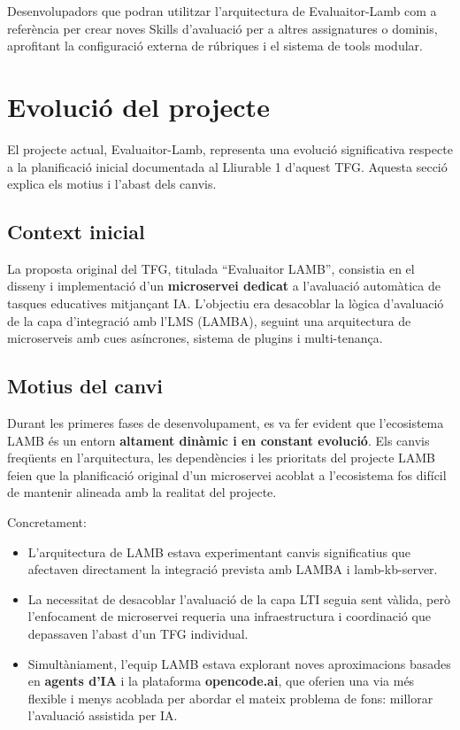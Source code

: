 \documentclass[12pt,a4paper,twoside]{report}
\begin{document}
Desenvolupadors que podran utilitzar l'arquitectura de Evaluaitor-Lamb com a refer\`encia per crear noves Skills d'avaluaci\'o per a altres assignatures o dominis, aprofitant la configuraci\'o externa de r\'ubriques i el sistema de tools modular.

\section{Evoluci\'o del projecte}
\label{sec:evolucio}

El projecte actual, Evaluaitor-Lamb, representa una evoluci\'o significativa respecte a la planificaci\'o inicial documentada al Lliurable 1 d'aquest TFG. Aquesta secci\'o explica els motius i l'abast dels canvis.

\subsection{Context inicial}

La proposta original del TFG, titulada ``Evaluaitor LAMB'', consistia en el disseny i implementaci\'o d'un \textbf{microservei dedicat} a l'avaluaci\'o autom\`atica de tasques educatives mitjan\c{c}ant IA. L'objectiu era desacoblar la l\`ogica d'avaluaci\'o de la capa d'integraci\'o amb l'LMS (LAMBA), seguint una arquitectura de microserveis amb cues as\'incrones, sistema de plugins i multi-tenan\c{c}a.

\subsection{Motius del canvi}

Durant les primeres fases de desenvolupament, es va fer evident que l'ecosistema LAMB \'es un entorn \textbf{altament din\`amic i en constant evoluci\'o}. Els canvis freq\"uents en l'arquitectura, les depend\`encies i les prioritats del projecte LAMB feien que la planificaci\'o original d'un microservei acoblat a l'ecosistema fos dif\'icil de mantenir alineada amb la realitat del projecte.

Concretament:

\begin{itemize}
    \item L'arquitectura de LAMB estava experimentant canvis significatius que afectaven directament la integraci\'o prevista amb LAMBA i lamb-kb-server.
    \item La necessitat de desacoblar l'avaluaci\'o de la capa LTI seguia sent v\`alida, per\`o l'enfocament de microservei requeria una infraestructura i coordinaci\'o que depassaven l'abast d'un TFG individual.
    \item Simult\`aniament, l'equip LAMB estava explorant noves aproximacions basades en \textbf{agents d'IA} i la plataforma \textbf{opencode.ai}, que oferien una via m\'es flexible i menys acoblada per abordar el mateix problema de fons: millorar l'avaluaci\'o assistida per IA.
\end{itemize}
\end{document}

